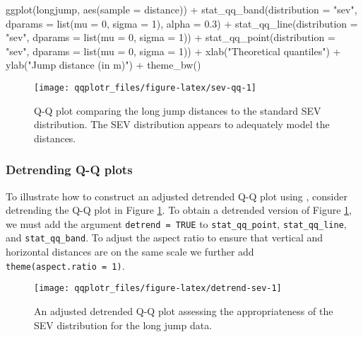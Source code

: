 \begin{Schunk}
\begin{Sinput}
ggplot(longjump, aes(sample = distance)) +
  stat_qq_band(distribution = "sev", dparams = list(mu = 0, sigma = 1), alpha = 0.3) +
  stat_qq_line(distribution = "sev", dparams = list(mu = 0, sigma = 1)) +
  stat_qq_point(distribution = "sev", dparams = list(mu = 0, sigma = 1)) +
  xlab("Theoretical quantiles") +
  ylab("Jump distance (in m)") +
  theme_bw()
\end{Sinput}
\begin{figure}

{\centering \texttt{[image: qqplotr\_files/figure-latex/sev-qq-1]} 

}

\caption[Q-Q plot comparing the long jump distances to the standard SEV distribution]{Q-Q plot comparing the long jump distances to the standard SEV distribution. The SEV distribution appears to adequately model the distances.}\label{fig:sev-qq}
\end{figure}
\end{Schunk}

\subsubsection{Detrending Q-Q plots}\label{detrending-q-q-plots}

\label{sec:detrending}


To illustrate how to construct an adjusted detrended Q-Q plot using
, consider detrending the Q-Q plot in Figure
\ref{fig:sev-qq}. To obtain a detrended version of Figure
\ref{fig:sev-qq}, we must add the argument \texttt{detrend\ =\ TRUE} to
\texttt{stat\_qq\_point}, \texttt{stat\_qq\_line}, and
\texttt{stat\_qq\_band}. To adjust the aspect ratio to ensure that
vertical and horizontal distances are on the same scale we further add
\texttt{theme(aspect.ratio\ =\ 1)}.

\begin{Schunk}
\begin{figure}

{\centering \texttt{[image: qqplotr\_files/figure-latex/detrend-sev-1]} 

}

\caption[An adjusted detrended Q-Q plot assessing the appropriateness of the SEV distribution for the long jump data]{An adjusted detrended Q-Q plot assessing the appropriateness of the SEV distribution for the long jump data.}\label{fig:detrend-sev}
\end{figure}
\end{Schunk}

